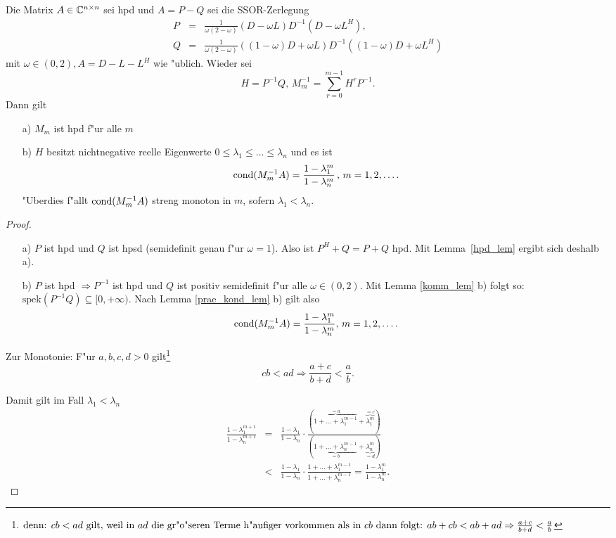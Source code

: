 \begin{sa} 
\label{S469}
Die Matrix $A \in \mathbb{C}^{n \times n} $ sei hpd und
$ A = P - Q $ sei die SSOR-Zerlegung
\begin{eqnarray*}
P & = & \frac{1}{\omega ( 2 - \omega)} ( D - \omega L ) D^{-1} (D - \omega L^H), \\
Q & = & \frac{1}{\omega (2 - \omega)} ( (1- \omega) D + \omega L) D^{-1} ((1 -\omega) D + \omega L^H)
\end{eqnarray*}
mit $ \omega \in (0, 2), A = D - L - L^H $ wie "ublich. Wieder sei
\[ H = P^{-1}Q, \, M_m^{-1} = \displaystyle{\sum_{r=0}^{m-1}} H^r P^{-1} .\]
Dann gilt
\begin{itemize}
\item[a)] $M_m$ ist hpd f"ur alle $m$
\item[b)] $H$ besitzt nichtnegative reelle Eigenwerte $ 0 \leq \lambda_1 \leq \ldots \leq \lambda_n$
und es ist
\[
\operatorname{cond} (M_m^{-1} A) = \frac{1 - \lambda_1^m}{1 - \lambda_n^m} \, , \, m = 1, 2 , \ldots .
\]
"Uberdies f"allt $ \operatorname{cond} (M_m^{-1} A) $ streng monoton in $m$, sofern $\lambda_1<\lambda_n$.
\end{itemize}
\end{sa}
\begin{proof}
\begin{itemize}
\item[a)]
$P$ ist hpd und $Q$ ist hpsd (semidefinit genau f"ur $\omega = 1$). Also ist $ P^H + Q = P + Q$ hpd. Mit
Lemma~\ref{hpd_lem} ergibt sich deshalb a).
\item[b)] $P$ ist hpd $ \Rightarrow P^{-1} $ ist hpd und $Q$ ist positiv semidefinit f"ur alle
$ \omega \in (0,2) $. Mit Lemma \ref{komm_lem} b) folgt so: $ \mbox{spek}(P^{-1} Q) \subseteq [0,
+ \infty) $. Nach Lemma \ref{prae_kond_lem} b) gilt also
\[
\operatorname{cond} (M_m^{-1} A) = \frac{1 - \lambda_1^m}{1 - \lambda_n^m}, \, m = 1, 2,
\ldots .
\]
\end{itemize}
Zur Monotonie: F"ur $ a, b, c, d > 0 $ gilt\footnote{$\mbox{denn: } cb < ad \mbox{ gilt, weil in } ad \mbox{ die gr"o"seren Terme h"aufiger vorkommen als in } cb \mbox{ dann folgt: } \\ ab+cb < ab + ad
\Rightarrow \frac{a+c}{b+d} <\frac{a}{b} $}
\[
cb < ad \Rightarrow \frac{a+c}{b+d} < \frac{a}{b}.
\]


\noindent Damit gilt im Fall $\lambda_1<\lambda_n$
\begin{eqnarray*}
\frac{1 - \lambda_1^{m+1}}{1 - \lambda_n^{m+1}} & = &
        \frac{1 - \lambda_1}{1 - \lambda_n} \cdot
              \frac{(\overbrace{1 + \ldots + \lambda_1^{m-1}}^{=a} +
                     \overbrace{\lambda_1^m}^{=c})}
                   {(\underbrace{1 + \ldots + \lambda_n^{m-1}}_{=b} +
                     \underbrace{\lambda_n^m}_{=d})} \\
& < & \frac{1 - \lambda_1}{1 - \lambda_n}\cdot
\frac{1 + \ldots + \lambda_1^{m-1}}{1 + \ldots + \lambda_n^{m - 1}}
= \frac{1 - \lambda_1^m}{1 - \lambda_n^m}.
\end{eqnarray*}
\end{proof}


